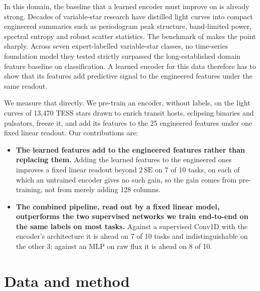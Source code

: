 \documentclass{article}
\begin{document}
In this domain, the baseline that a learned encoder must improve on is already strong. Decades of variable-star
research have distilled light curves into compact engineered summaries such as periodogram peak
structure, band-limited power, spectral entropy and robust scatter statistics. The benchmark of
\citet{li2025staremb} makes the point sharply. Across seven expert-labelled variable-star classes, no
time-series foundation model they tested strictly surpassed the long-established domain feature
baseline on classification. A learned encoder for this data therefore has to show that its features
add predictive signal to the engineered features under the same readout.

We measure that directly. We pre-train an encoder, without labels, on the light curves of 13{,}470
TESS stars drawn to enrich transit hosts, eclipsing binaries and pulsators, freeze it, and add its
features to the 25 engineered features under one fixed linear readout. Our contributions are:

\begin{itemize}
\item \textbf{The learned features add to the engineered features rather than replacing them.}
Adding the learned features to the engineered ones improves a fixed linear readout beyond
$2\,\mathrm{SE}$ on 7 of 10 tasks, on each of which an untrained encoder gives no such gain, so the gain comes
from pre-training, not from merely adding 128 columns.
\item \textbf{The combined pipeline, read out by a fixed linear model, outperforms the two
supervised networks we train end-to-end on the same labels on most tasks.} Against a supervised Conv1D with the
encoder's architecture it is ahead on 7
of 10 tasks and indistinguishable on the other 3; against an MLP on raw flux it is ahead on 8 of 10.
\end{itemize}

\section{Data and method}
\end{document}
